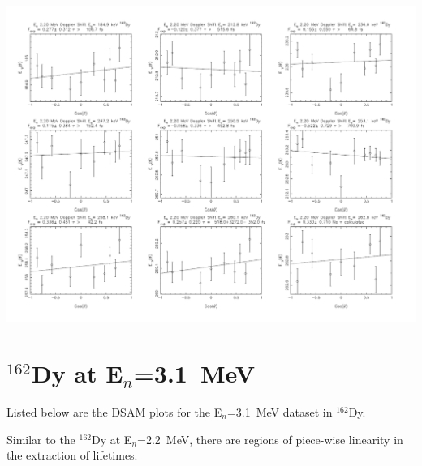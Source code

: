 \begin{center}
\includegraphics[page=15,angle=90,height=0.95\textheight]{162Dy_ftau_220_HE_n.pdf}
\end{center}


\section{$^{162}$Dy at E$_n$=3.1~MeV}\label{app:DSAM_Dy_31}
Listed below are the DSAM plots for the E$_n$=3.1~MeV dataset in $^{162}$Dy.

Similar to the $^{162}$Dy at E$_n$=2.2~MeV, there are regions of piece-wise linearity in the extraction of lifetimes.

